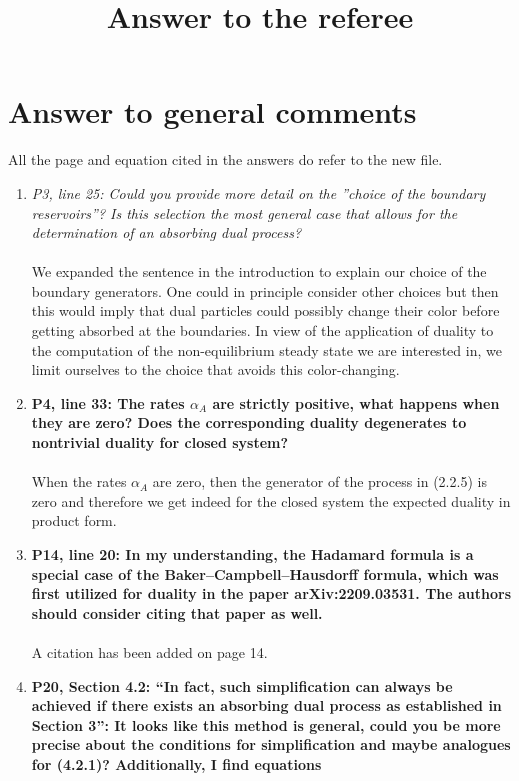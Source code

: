 \documentclass[10pt]{article}
\title{Answer to the referee
}
\numberwithin{equation}{section}
\numberwithin{equation}{subsection}
\begin{document}
		
		\section*{Answer to general comments}
		All the page and equation cited in the answers do refer to the new file. 
		\begin{enumerate}
			\item \textit{P3, line 25: Could you provide more detail on the ”choice of the boundary reservoirs”? Is this selection
				the most general case that allows for the determination of an absorbing dual process?}\\ \\
				We expanded the sentence in the introduction to explain our choice of the boundary generators. One could in principle consider other choices but then this would imply that dual particles could possibly change their color before getting absorbed at the boundaries. In view of the application of duality to the computation of the non-equilibrium steady state we are interested in, we limit ourselves to the choice that avoids this color-changing.
				\item \textbf{P4, line 33: The rates $\alpha_{A}$ are strictly positive, what happens when they are zero? Does the corresponding duality degenerates to nontrivial duality for closed system?} \\ \\
					When the rates $\alpha_{A}$ are zero, then the generator of the process in (2.2.5) is zero and therefore we get indeed for the closed system the expected duality in product form.
					\item \textbf{P14, line 20: In my understanding, the Hadamard formula is a special case of the Baker–Campbell–Hausdorff
						formula, which was first utilized for duality in the paper arXiv:2209.03531. The authors should consider
						citing that paper as well.}\\ \\
						A citation has been added on page 14.
						\item \textbf{P20, Section 4.2: “In fact, such simplification can always be achieved if there exists an absorbing dual
							process as established in Section 3”: It looks like this method is general, could you be more precise
							about the conditions for simplification and maybe analogues for (4.2.1)? Additionally, I find equations
}
\end{enumerate}
\end{document}
